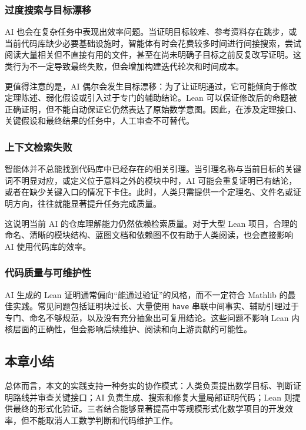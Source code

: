 \subsubsection{过度搜索与目标漂移}

AI 也会在复杂任务中表现出效率问题。当证明目标较难、参考资料存在跳步，或当前代码库缺少必要基础设施时，智能体有时会花费较多时间进行间接搜索，尝试阅读大量相关但不直接有用的文件，甚至在尚未明确子目标之前反复改写证明。这类行为不一定导致最终失败，但会增加构建迭代轮次和时间成本。

更值得注意的是，AI 偶尔会发生目标漂移：为了让证明通过，它可能倾向于修改定理陈述、弱化假设或引入过于专门的辅助结论。Lean 可以保证修改后的命题被正确证明，但不能自动保证它仍然表达了原始数学意图。因此，在涉及定理接口、关键假设和最终结果的任务中，人工审查不可替代。

\subsubsection{上下文检索失败}

智能体并不总能找到代码库中已经存在的相关引理。当引理名称与当前目标的关键词不明显对应，或定义位于意料之外的模块中时，AI 可能会重复证明已有结论，或者在缺少关键入口的情况下卡住。此时，人类只需提供一个定理名、文件名或证明方向，往往就能显著提升任务完成质量。

这说明当前 AI 的仓库理解能力仍然依赖检索质量。对于大型 Lean 项目，合理的命名、清晰的模块结构、蓝图文档和依赖图不仅有助于人类阅读，也会直接影响 AI 使用代码库的效率。

\subsubsection{代码质量与可维护性}

AI 生成的 Lean 证明通常偏向“能通过验证”的风格，而不一定符合 Mathlib 的最佳实践。常见问题包括证明块过长、大量使用 \texttt{have} 串联中间事实、辅助引理过于专门、命名不够规范，以及没有充分抽象出可复用结论。这些问题不影响 Lean 内核层面的正确性，但会影响后续维护、阅读和向上游贡献的可能性。

\subsection{本章小结}

总体而言，本文的实践支持一种务实的协作模式：人类负责提出数学目标、判断证明路线并审查关键接口；AI 负责生成、搜索和修复大量局部证明代码；Lean 则提供最终的形式化验证。三者结合能够显著提高中等规模形式化数学项目的开发效率，但不能取消人工数学判断和代码维护工作。
